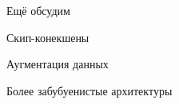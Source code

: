 \documentclass[notes,12pt, aspectratio=169]{beamer}
\newenvironment{wideitemize}{\itemize\addtolength{\itemsep}{10pt}}{\enditemize}
\begin{document}
\begin{frame}{Ещё обсудим}
\begin{wideitemize}
	\item Скип-конекшены 
	\item Аугментация данных 
	\item Более забубуенистые архитектуры 
\end{wideitemize}
\end{frame}


\end{document}
